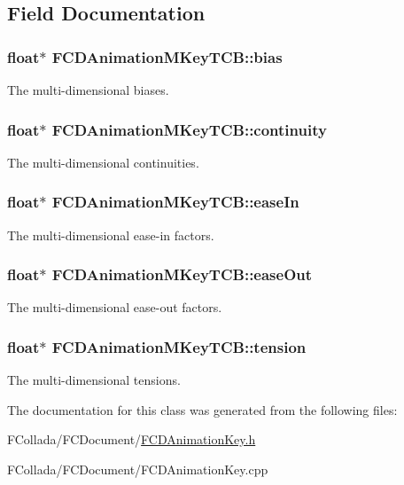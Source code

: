 \subsection{Field Documentation}
\hypertarget{classFCDAnimationMKeyTCB_ae3812b7c36b879e9fd9ecfe67120c219}{
\subsubsection[{bias}]{\setlength{\rightskip}{0pt plus 5cm}float$\ast$ {\bf FCDAnimationMKeyTCB::bias}}}
\label{classFCDAnimationMKeyTCB_ae3812b7c36b879e9fd9ecfe67120c219}
The multi-\/dimensional biases. \hypertarget{classFCDAnimationMKeyTCB_aad952e9ad96796b79ffbd7ea15fa4ce7}{
\subsubsection[{continuity}]{\setlength{\rightskip}{0pt plus 5cm}float$\ast$ {\bf FCDAnimationMKeyTCB::continuity}}}
\label{classFCDAnimationMKeyTCB_aad952e9ad96796b79ffbd7ea15fa4ce7}
The multi-\/dimensional continuities. \hypertarget{classFCDAnimationMKeyTCB_a7e35030931711b58ae099eee73d05102}{
\subsubsection[{easeIn}]{\setlength{\rightskip}{0pt plus 5cm}float$\ast$ {\bf FCDAnimationMKeyTCB::easeIn}}}
\label{classFCDAnimationMKeyTCB_a7e35030931711b58ae099eee73d05102}
The multi-\/dimensional ease-\/in factors. \hypertarget{classFCDAnimationMKeyTCB_a9cea41d40b917bc3f5151320318c49fe}{
\subsubsection[{easeOut}]{\setlength{\rightskip}{0pt plus 5cm}float$\ast$ {\bf FCDAnimationMKeyTCB::easeOut}}}
\label{classFCDAnimationMKeyTCB_a9cea41d40b917bc3f5151320318c49fe}
The multi-\/dimensional ease-\/out factors. \hypertarget{classFCDAnimationMKeyTCB_a05aa82c6e377a34c8d4c521f05739070}{
\subsubsection[{tension}]{\setlength{\rightskip}{0pt plus 5cm}float$\ast$ {\bf FCDAnimationMKeyTCB::tension}}}
\label{classFCDAnimationMKeyTCB_a05aa82c6e377a34c8d4c521f05739070}
The multi-\/dimensional tensions. 

The documentation for this class was generated from the following files:\begin{DoxyCompactItemize}
\item 
FCollada/FCDocument/\hyperlink{FCDAnimationKey_8h}{FCDAnimationKey.h}\item 
FCollada/FCDocument/FCDAnimationKey.cpp\end{DoxyCompactItemize}
